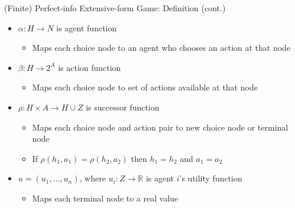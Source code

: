\documentclass[11pt,aspectratio=169]{beamer}
\begin{document}
  
  \begin{frame}{(Finite) Perfect-info Extensive-form Game: Definition (cont.)}
   \begin{itemize}[<+->]
   \setlength{\itemsep}{1em}
    \item $\alpha : H \rightarrow N$ is \alert{agent function}
    \begin{itemize}[<.->]
     \item Maps each choice node to an agent who chooses an action at that node
    \end{itemize}
    \item $\beta : H \rightarrow 2^{A}$ is \alert{action function}
    \begin{itemize}[<.->]
     \item Maps each choice node to set of actions available at that node
    \end{itemize}
    \item $\rho: H \times A \rightarrow H \cup Z$ is \alert{successor function}
    \begin{itemize}[<.->]
     \item Maps each choice node and action pair to new choice node or terminal node
     \item If $\rho(h_1, a_1) = \rho(h_2, a_2)$ then $h_1 = h_2$ and $a_1 = a_2$
    \end{itemize}
    \item $u = (u_1, \dots, u_n)$, where $u_i: Z \rightarrow \mathbb{R}$ is agent $i$'s \alert{utility function}
    \begin{itemize}[<.->]
     \item Maps each terminal node to a real value
    \end{itemize}
   \end{itemize}
  \end{frame} 
  
\end{document}
